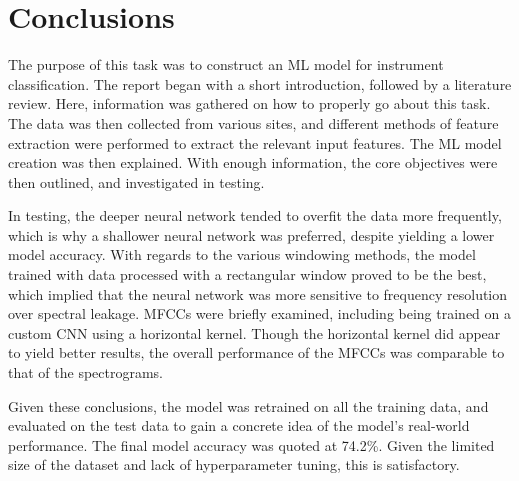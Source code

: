 \documentclass[class=report,11pt,crop=false]{standalone}
\begin{document}
\ifstandalone
\tableofcontents
\fi
\section{Conclusions \label{ch:conclusions}}

The purpose of this task was to construct an ML model for instrument classification. The report began with a short introduction, followed by a literature review. Here, information was gathered on how to properly go about this task. The data was then collected from various sites, and different methods of feature extraction were performed to extract the relevant input features. The ML model creation was then explained. With enough information, the core objectives were then outlined, and investigated in testing. 

In testing, the deeper neural network tended to overfit the data more frequently, which is why a shallower neural network was preferred, despite yielding a lower model accuracy. With regards to the various windowing methods, the model trained with data processed with a rectangular window proved to be the best, which implied that the neural network was more sensitive to frequency resolution over spectral leakage. MFCCs were briefly examined, including being trained on a custom CNN using a horizontal kernel. Though the horizontal kernel did appear to yield better results, the overall performance of the MFCCs was comparable to that of the spectrograms.

Given these conclusions, the model was retrained on all the training data, and evaluated on the test data to gain a concrete idea of the model's real-world performance. The final model accuracy was quoted at 74.2\%. Given the limited size of the dataset and lack of hyperparameter tuning, this is satisfactory.

\ifstandalone

\printnoidxglossary[type=\acronymtype,nonumberlist]
\fi
\end{document}
